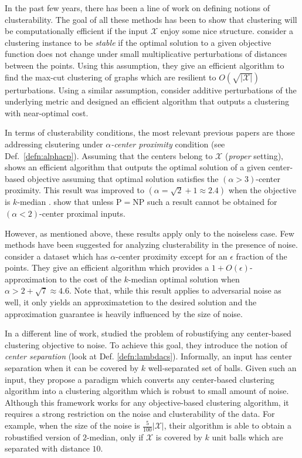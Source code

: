 \documentclass[anon,12pt]{colt2016} %
\newcommand{\mc}{\mathcal}
\begin{document}
In the past few years, there has been a line of work on defining notions of clusterability. The goal of all these methods has been to show that clustering will be computationally efficient if the input $\mc X$ enjoy some nice structure. \cite{bilu2012stable} consider a clustering instance to be \emph{stable} if the optimal solution to a given objective function does not change under small multiplicative perturbations of distances between the points. Using this assumption, they give an efficient algorithm to find the max-cut clustering of graphs which are resilient to $O(\sqrt{|\mc X|})$ perturbations. Using a similar assumption, \cite{ackerman2009clusterability} consider additive perturbations of the underlying metric and designed an efficient algorithm that outputs a clustering with near-optimal cost. 


In terms of clusterability conditions, the most relevant previous papers are those addressing clsutering under {\em $\alpha$-center proximity} condition (see Def.~\ref{defn:alphacp}).
Assuming that the centers belong to $\mc X$ ({\em proper} setting),  \cite{awasthi2012center} shows an efficient algorithm that outputs the optimal solution of a given center-based objective assuming that optimal solution satisfies the $(\alpha > 3)$-center proximity. This result was improved to $(\alpha = \sqrt{2} + 1 \approx 2.4)$ when the objective is $k$-median \cite{balcan2012clustering}. \cite{ben2014data} show that unless P$=$NP such a result cannot be obtained for $(\alpha <2)$-center proximal inputs.

However, as mentioned above, these results apply only to the noiseless case.
Few methods have been suggested for analyzing clusterability in the presence of noise. 
\cite{balcan2012clustering} consider a dataset which has $\alpha$-center proximity except for an $\epsilon$ fraction of the points. They give an efficient algorithm which provides a $1+O(\epsilon)$-approximation to the cost of the $k$-median optimal solution when $\alpha > 2+\sqrt{7} \approx 4.6$. Note that, while this result applies to adversarial noise as well, it only yields an approximatetion to the desired solution and  the approximation guarantee is heavily influenced by the size of noise.

In a different line of work, \cite{ben2014clustering} studied the problem of robustifying any center-based clustering objective to noise. To achieve this goal, they introduce the notion of {\em center separation} (look at Def. \ref{defn:lambdacs}). Informally, an input has center separation when it can be covered by $k$ well-separated set of balls.
Given such an input, they propose a paradigm which converts any center-based clustering algorithm into a clustering algorithm which is robust to small amount of noise.
Although this framework works for any objective-based clustering algorithm, it requires a strong restriction on the noise and clusterability of the data. For example, when the size of the noise is $\frac{5}{100}|\mc X|$, their algorithm is able to obtain a robustified version of $2$-median, only if $\mc X$ is covered by $k$ unit balls which are separated with distance $10$. 
\end{document}
